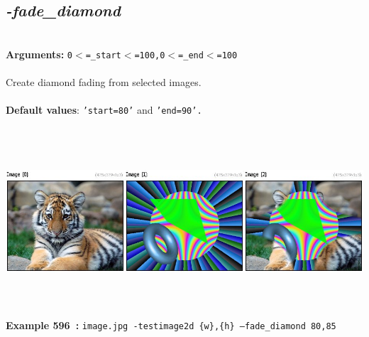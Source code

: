 \documentclass[a4paper,11pt,twoside]{book}
\begin{document}
\subsection{\emph{-fade\_diamond} }\vspace*{-0.5em}
~\\\textbf{Arguments: } 
{\small \texttt{0$<$=\_start$<$=100,0$<$=\_end$<$=100}}\\~\\
Create diamond fading from selected images.
~\\~\\\textbf{Default values}: {\small \texttt{'start=80'} and \texttt{'end=90'.}}
\begin{center}\includegraphics[keepaspectratio=true,height=7cm,width=\textwidth]{img/gmic_def596.jpg}\\
{\footnotesize \textbf{Example 596~:} \texttt{image.jpg -testimage2d \{w\},\{h\} --fade\_diamond 80,85}}
\end{center}
\end{document}
